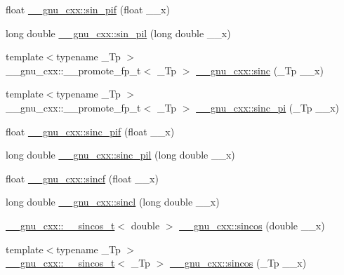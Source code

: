 \begin{DoxyCompactItemize}
\item 
float \hyperlink{group__gnu__math__spec__func_ga74fc8e2dd770850e7ea8bf8a28a71777}{\+\_\+\+\_\+gnu\+\_\+cxx\+::sin\+\_\+pif} (float \+\_\+\+\_\+x)
\item 
long double \hyperlink{group__gnu__math__spec__func_ga0bda860961b0a121e266b278f260634b}{\+\_\+\+\_\+gnu\+\_\+cxx\+::sin\+\_\+pil} (long double \+\_\+\+\_\+x)
\item 
{\footnotesize template$<$typename \+\_\+\+Tp $>$ }\\\+\_\+\+\_\+gnu\+\_\+cxx\+::\+\_\+\+\_\+promote\+\_\+fp\+\_\+t$<$ \+\_\+\+Tp $>$ \hyperlink{group__gnu__math__spec__func_ga6a11b9d949ab86f9fd170dcf0d3b1251}{\+\_\+\+\_\+gnu\+\_\+cxx\+::sinc} (\+\_\+\+Tp \+\_\+\+\_\+x)
\item 
{\footnotesize template$<$typename \+\_\+\+Tp $>$ }\\\+\_\+\+\_\+gnu\+\_\+cxx\+::\+\_\+\+\_\+promote\+\_\+fp\+\_\+t$<$ \+\_\+\+Tp $>$ \hyperlink{group__gnu__math__spec__func_ga3dbc3831c1bd9f2a8be05496db9375a0}{\+\_\+\+\_\+gnu\+\_\+cxx\+::sinc\+\_\+pi} (\+\_\+\+Tp \+\_\+\+\_\+x)
\item 
float \hyperlink{group__gnu__math__spec__func_gad92d43d5332c80d1a27c90bfe3f6417e}{\+\_\+\+\_\+gnu\+\_\+cxx\+::sinc\+\_\+pif} (float \+\_\+\+\_\+x)
\item 
long double \hyperlink{group__gnu__math__spec__func_gaad38a6e40b1272391a26dbb32a684b3c}{\+\_\+\+\_\+gnu\+\_\+cxx\+::sinc\+\_\+pil} (long double \+\_\+\+\_\+x)
\item 
float \hyperlink{group__gnu__math__spec__func_gaa87f0734cfe7823c932511ac2f0a876c}{\+\_\+\+\_\+gnu\+\_\+cxx\+::sincf} (float \+\_\+\+\_\+x)
\item 
long double \hyperlink{group__gnu__math__spec__func_ga79a8fd931f5ad4f737e2931e636149ac}{\+\_\+\+\_\+gnu\+\_\+cxx\+::sincl} (long double \+\_\+\+\_\+x)
\item 
\hyperlink{struct____gnu__cxx_1_1____sincos__t}{\+\_\+\+\_\+gnu\+\_\+cxx\+::\+\_\+\+\_\+sincos\+\_\+t}$<$ double $>$ \hyperlink{group__gnu__math__spec__func_ga8041c24b528475bcf8a4178e484652a3}{\+\_\+\+\_\+gnu\+\_\+cxx\+::sincos} (double \+\_\+\+\_\+x)
\item 
{\footnotesize template$<$typename \+\_\+\+Tp $>$ }\\\hyperlink{struct____gnu__cxx_1_1____sincos__t}{\+\_\+\+\_\+gnu\+\_\+cxx\+::\+\_\+\+\_\+sincos\+\_\+t}$<$ \+\_\+\+Tp $>$ \hyperlink{group__gnu__math__spec__func_ga49243d9883994c9c10c82ae79596457b}{\+\_\+\+\_\+gnu\+\_\+cxx\+::sincos} (\+\_\+\+Tp \+\_\+\+\_\+x)

\end{DoxyCompactItemize}
